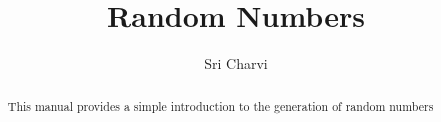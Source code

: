 \documentclass[journal,12pt,twocolumn]{IEEEtran}
\renewcommand\thesection{\arabic{section}}
\begin{document}
\makeatletter
{}
\makeatother
\let\StandardTheFigure\thefigure
\renewcommand{\thefigure}{\thesection}
\makeatletter
{}
\makeatother
\let\StandardTheFigure\thefigure
\let\StandardTheTable\thetable
\let\vec\mathbf
{}
\vspace{3cm}
\title{%
	Random Numbers
}
%
%
%
\author{Sri Charvi}
\maketitle
\tableofcontents
\bigskip
\renewcommand{\thefigure}{\theenumi}
\renewcommand{\thetable}{\theenumi}
\begin{abstract}
This manual provides a simple introduction to the generation of random numbers
\end{abstract}
\end{document}
